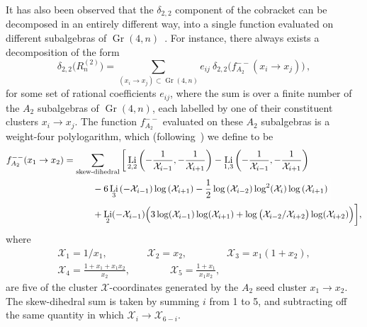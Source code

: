 \documentclass[11pt]{article}
\DeclareMathOperator{\Gr}{Gr}
\DeclareMathOperator{\Li}{Li}
\def\x{\mathcal{X}}
\begin{document}
It has also been observed that the $\delta_{2,2}$ component of the cobracket can be decomposed in an entirely different way, into a single function evaluated on different subalgebras of $\Gr(4,n)$~\cite{Golden:2014xqa}. For instance, there always exists a decomposition of the form
\begin{equation} \label{eq:a2_decomp}
	\delta_{2,2} \big(R_n^{(2)}\big) = \!\! \sum_{(x_i\to x_j) \subset \Gr(4,n)} \!\!\! e_{ij} ~\delta_{2,2}\big(f^{--}_{A_2}(x_i \to x_j) \big) \, ,
\end{equation}
for some set of rational coefficients $e_{ij}$, where the sum is over a finite number of the $A_2$ subalgebras of $\Gr(4,n)$, each labelled by one of their constituent clusters $x_i \to x_j$. The function $f^{--}_{A_2}$ evaluated on these $A_2$ subalgebras is a weight-four polylogarithm, which (following~\cite{Golden:2018gtk}) we define to be
\begin{align}\label{def:a2-function}
        f^{--}_{A_2}(x_1 \to x_2)  &= \sum_{\text{skew-dihedral}} \bigg[ \Li_{2,2}\left(-\frac{1}{\x_{i-1}},-\frac{1}{\x_{i+1}}\right) - \Li_{1,3}\left(-\frac{1}{\x_{i-1}},-\frac{1}{\x_{i+1}}\right)  \\
        &\hspace{1.1cm} -6 \Li_3\left(-\x_{i-1}\right) \log \left(\x_{i+1}\right) -\frac{1}{2} \log \left(\x_{i-2}\right) \log^2\! \left(\x_i\right) \log \left(\x_{i+1}\right)  {\color{white} \bigg|} \nonumber \\
        &\hspace{1.1cm} +\Li_2(-\x_{i-1}) \Big(3 \log (\x_{i-1})\log (\x_{i+1})+\log \big(\x_{i-2}/\x_{i+2}\big)\log (\x_{i+2})\Big) \bigg], \nonumber
\end{align}
where 
\begin{gather}\label{def:a2-xcoords}
  \x_1 = 1/x_1, \qquad \qquad \x_2 = x_2, \qquad \qquad \x_3 = x_1(1+x_2), \\ 
  \x_4 = \frac{1+x_1+x_1 x_2}{x_2}, \qquad \qquad \x_5 = \frac{1+x_1}{x_1 x_2}, \nonumber
\end{gather}
are five of the cluster $\x$-coordinates generated by the $A_2$ seed cluster $x_1 \to x_2$. The skew-dihedral sum is taken by summing $i$ from 1 to 5, and subtracting off the same quantity in which $\x_i \to \x_{6-i}$.
\end{document}
